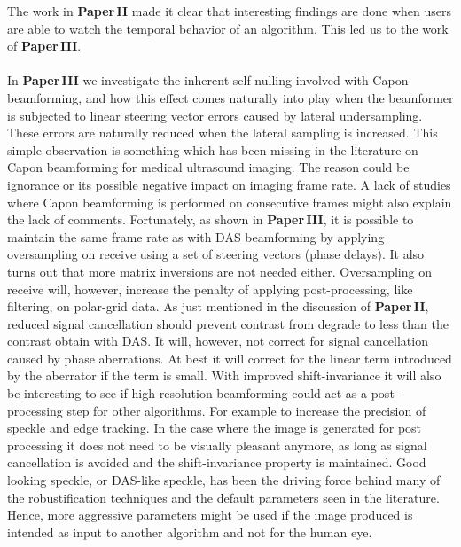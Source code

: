 The work in \textbf{Paper\,II} made it clear that interesting findings are done when users are able to watch the temporal behavior of an algorithm. This led us to the work of \textbf{Paper\,III}. 
\\\\
In \textbf{Paper\,III} we investigate the inherent self nulling involved with Capon beamforming, and how this effect comes naturally into play when the beamformer is subjected to linear steering vector errors caused by lateral undersampling. These errors are naturally reduced when the lateral sampling is increased. This simple observation is something which has been missing in the literature on Capon beamforming for medical ultrasound imaging. The reason could be ignorance or its possible negative impact on imaging frame rate. A lack of studies where Capon beamforming is performed on consecutive frames might also explain the lack of comments. Fortunately, as shown in \textbf{Paper\,III}, it is possible to maintain the same frame rate as with DAS beamforming by applying oversampling on receive using a set of steering vectors (phase delays). It also turns out that more matrix inversions are not needed either. Oversampling on receive will, however,  increase the penalty of applying post-processing, like filtering,  on polar-grid data. %
As just mentioned in the discussion of \textbf{Paper\,II}, reduced signal cancellation should prevent contrast from degrade to less than the contrast obtain with DAS. It will, however,  not correct for signal cancellation caused by phase aberrations. At best it will correct for the linear term introduced by the aberrator if the term is small.
With improved shift-invariance it will also be interesting to see if high resolution beamforming could act as a post-processing step for other algorithms. For example to increase the precision of speckle and edge tracking. In the case where the image is generated for post processing it does not need to be visually pleasant anymore, as long as signal cancellation is avoided and the shift-invariance property is maintained. Good looking speckle, or DAS-like speckle, has been the driving force behind many of the robustification techniques and the default parameters seen in the literature. Hence, more aggressive parameters might be used if the image produced is intended as input to another algorithm and not for the human eye.
